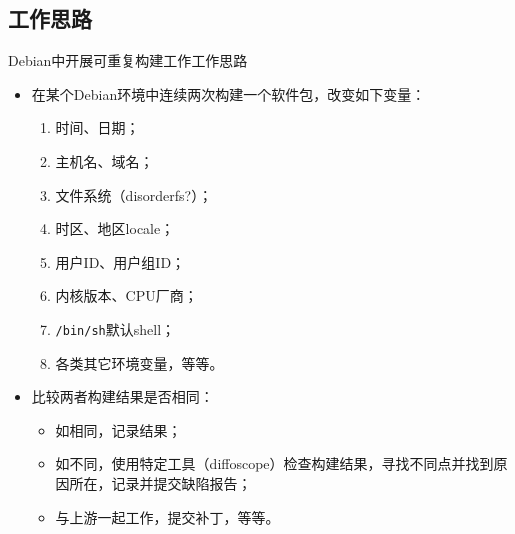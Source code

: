 \documentclass{beamer}
\begin{document}
\subsection{工作思路}
\begin{frame}{Debian中开展可重复构建工作}{工作思路}
\begin{itemize}
\item {在某个Debian环境中连续两次构建一个软件包，改变如下变量：
  \begin{enumerate}
  \item 时间、日期；
  \item 主机名、域名；
  \item 文件系统（disorderfs?）；
  \item 时区、地区locale；
  \item 用户ID、用户组ID；
  \item 内核版本、CPU厂商；
  \item \texttt{/bin/sh}默认shell；
  \item 各类其它环境变量，等等。
  \end{enumerate}
  }
\item {比较两者构建结果是否相同：
  \begin{itemize}
    \item 如相同，记录结果；
    \item 如不同，使用特定工具（diffoscope）检查构建结果，寻找不同点并找到原因所在，记录并提交缺陷报告；
    \item 与上游一起工作，提交补丁，等等。
  \end{itemize}
}
\end{itemize}
\end{frame}
\end{document}
